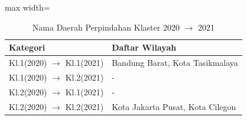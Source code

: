\begin{table}[H]
\centering
\caption{Nama Daerah Perpindahan Klaster 2020 \(\rightarrow\) 2021} \label{tab:transname2020x2021}
\begin{adjustbox}{max width=\textwidth}
\begin{tabular}{|p{4cm}|p{10cm}|}
\hline
\textbf{Kategori} & \textbf{Daftar Wilayah} \\
\hline
Kl.1(2020) \(\rightarrow\) Kl.1(2021) & Bandung Barat, Kota Tasikmalaya \\
\hline
Kl.1(2020) \(\rightarrow\) Kl.2(2021) & - \\
\hline
Kl.2(2020) \(\rightarrow\) Kl.1(2021) & - \\
\hline
Kl.2(2020) \(\rightarrow\) Kl.2(2021) & Kota Jakarta Pusat, Kota Cilegon \\
\hline
\end{tabular}
\end{adjustbox}
\end{table}